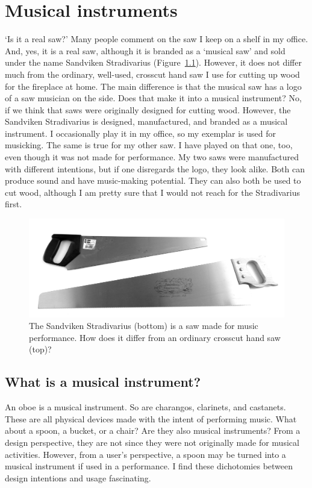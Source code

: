 \chapter{Musical instruments}

`Is it a real saw?' Many people comment on the saw I keep on a shelf in my office. And, yes, it is a real saw, although it is branded as a `musical saw' and sold under the name Sandviken Stradivarius (Figure~\ref{fig:sandviken}). However, it does not differ much from the ordinary, well-used, crosscut hand saw I use for cutting up wood for the fireplace at home. The main difference is that the musical saw has a logo of a saw musician on the side. Does that make it into a musical instrument? No, if we think that saws were originally designed for cutting wood. However, the Sandviken Stradivarius is designed, manufactured, and branded as a musical instrument. I occasionally play it in my office, so my exemplar is used for musicking. The same is true for my other saw. I have played on that one, too, even though it was not made for performance. My two saws were manufactured with different intentions, but if one disregards the logo, they look alike. Both can produce sound and have music-making potential. They can also both be used to cut wood, although I am pretty sure that I would not reach for the Stradivarius first.

\begin{figure}[tp]
\includegraphics[width=\columnwidth]{figures/15-saw6.jpg}
\caption{The Sandviken Stradivarius (bottom) is a saw made for music performance. How does it differ from an ordinary crosscut hand saw (top)?}
\label{fig:sandviken}
\end{figure}



\section{What is a musical instrument?}

An oboe is a musical instrument. So are charangos, clarinets, and castanets. These are all physical devices made with the intent of performing music. What about a spoon, a bucket, or a chair? Are they also musical instruments? From a design perspective, they are not since they were not originally made for musical activities. However, from a user's perspective, a spoon may be turned into a musical instrument if used in a performance. I find these dichotomies between design intentions and usage fascinating.

